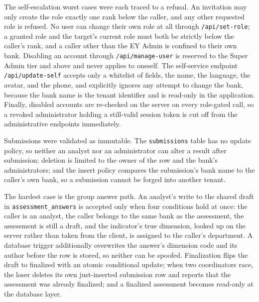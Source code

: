 \begin{sloppypar}
The self-escalation worst cases were each traced to a refusal. An invitation may only create the role exactly one rank below the caller, and any other requested role is refused. No user can change their own role at all through \texttt{/api/set-role}; a granted role and the target's current role must both be strictly below the caller's rank, and a caller other than the EY Admin is confined to their own bank. Disabling an account through \texttt{/api/manage-user} is reserved to the Super Admin tier and above and never applies to oneself. The self-service endpoint \texttt{/api/update-self} accepts only a whitelist of fields, the name, the language, the avatar, and the phone, and explicitly ignores any attempt to change the bank, because the bank name is the tenant identifier and is read-only in the application. Finally, disabled accounts are re-checked on the server on every role-gated call, so a revoked administrator holding a still-valid session token is cut off from the administrative endpoints immediately.
\end{sloppypar}

\begin{sloppypar}
Submissions were validated as immutable. The \texttt{submissions} table has no update policy, so neither an analyst nor an administrator can alter a result after submission; deletion is limited to the owner of the row and the bank's administrators; and the insert policy compares the submission's bank name to the caller's own bank, so a submission cannot be forged into another tenant.
\end{sloppypar}

\begin{sloppypar}
The hardest case is the group answer path. An analyst's write to the shared draft in \texttt{assessment\_answers} is accepted only when four conditions hold at once: the caller is an analyst, the caller belongs to the same bank as the assessment, the assessment is still a draft, and the indicator's true dimension, looked up on the server rather than taken from the client, is assigned to the caller's department. A database trigger additionally overwrites the answer's dimension code and its author before the row is stored, so neither can be spoofed. Finalization flips the draft to finalized with an atomic conditional update; when two coordinators race, the loser deletes its own just-inserted submission row and reports that the assessment was already finalized; and a finalized assessment becomes read-only at the database layer.
\end{sloppypar}

